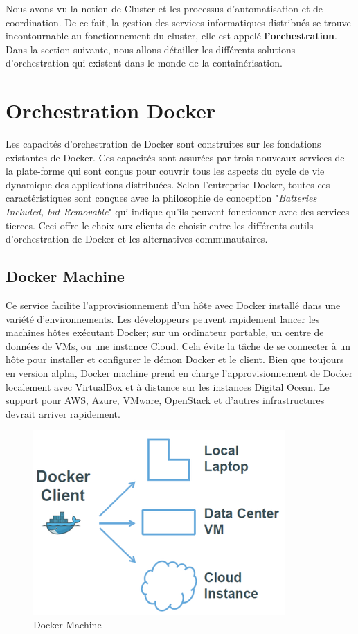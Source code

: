 \begin{onehalfspace}
Nous avons vu la notion de Cluster et les processus d'automatisation et de coordination. De ce fait, la gestion des services informatiques distribués se trouve incontournable au fonctionnement du cluster, elle est appelé \textbf{l'orchestration}. Dans la section suivante, nous allons détailler les différents solutions d'orchestration qui existent dans le monde de la containérisation.

\section{Orchestration Docker}
Les capacités d'orchestration de Docker sont construites sur les fondations existantes de Docker. Ces capacités sont assurées par trois nouveaux services de la plate-forme qui sont conçus pour couvrir tous les aspects du cycle de vie dynamique des applications distribuées. Selon l'entreprise Docker, toutes ces caractéristiques sont conçues avec la philosophie de conception "\emph{Batteries Included, but Removable}" qui indique qu'ils peuvent fonctionner avec des services tierces. Ceci offre le choix aux clients de choisir entre les différents outils d'orchestration de Docker et les alternatives communautaires.


\subsection*{Docker Machine}
 Ce service facilite l'approvisionnement d'un hôte avec Docker installé dans une variété d'environnements. Les développeurs peuvent rapidement lancer les machines hôtes exécutant Docker; sur un ordinateur portable, un centre de données de VMs, ou une instance Cloud. Cela évite la tâche de se connecter à un hôte pour installer et configurer le démon Docker et le client. Bien que toujours en version alpha, Docker machine prend en charge l'approvisionnement de Docker localement avec VirtualBox et à distance sur les instances Digital Ocean. Le support pour AWS, Azure, VMware, OpenStack et d'autres infrastructures devrait arriver rapidement.
 \begin{figure}[H]
\centering
\includegraphics [scale=0.6]{chapitre3/assets/dockermachine.png}
\caption{Docker Machine \cite{docker-machine}}
\end{figure}

\end{onehalfspace}

